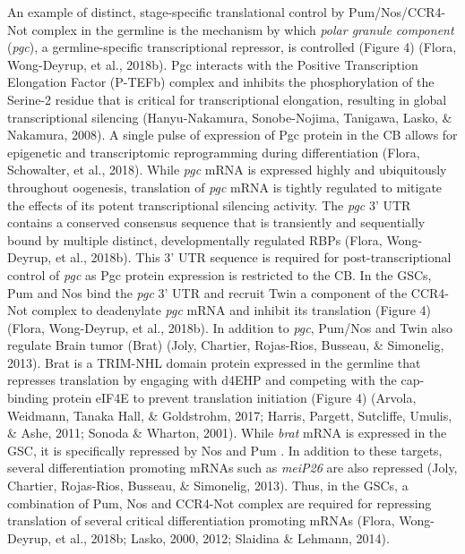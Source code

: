 \documentclass[12pt,oneside]{reedthesis}
\begin{document}
An example of distinct, stage-specific translational control by
Pum/Nos/CCR4-Not complex in the germline is the mechanism by which
\emph{polar granule component} (\emph{pgc}), a germline-specific transcriptional
repressor, is controlled (Figure 4) (Flora, Wong-Deyrup, et al., 2018b). Pgc interacts with
the Positive Transcription Elongation Factor (P-TEFb) complex and
inhibits the phosphorylation of the Serine-2 residue that is critical
for transcriptional elongation, resulting in global transcriptional
silencing (Hanyu-Nakamura, Sonobe-Nojima, Tanigawa, Lasko, \& Nakamura, 2008). A single pulse of expression of Pgc
protein in the CB allows for epigenetic and transcriptomic reprogramming
during differentiation (Flora, Schowalter, et al., 2018). While \emph{pgc} mRNA is expressed
highly and ubiquitously throughout oogenesis, translation of \emph{pgc} mRNA
is tightly regulated to mitigate the effects of its potent
transcriptional silencing activity. The \emph{pgc} 3' UTR contains a
conserved consensus sequence that is transiently and sequentially bound
by multiple distinct, developmentally regulated RBPs (Flora, Wong-Deyrup, et al., 2018b).
This 3' UTR sequence is required for post-transcriptional control of
\emph{pgc} as Pgc protein expression is restricted to the CB. In the GSCs,
Pum and Nos bind the \emph{pgc} 3' UTR and recruit Twin a component of the
CCR4-Not complex to deadenylate \emph{pgc} mRNA and inhibit its translation
(Figure 4) (Flora, Wong-Deyrup, et al., 2018b). In addition to \emph{pgc}, Pum/Nos and Twin also
regulate Brain tumor (Brat) (Joly, Chartier, Rojas-Rios, Busseau, \& Simonelig, 2013). Brat is a TRIM-NHL domain
protein expressed in the germline that represses translation by engaging
with d4EHP and competing with the cap-binding protein eIF4E to prevent
translation initiation (Figure 4) (Arvola, Weidmann, Tanaka Hall, \& Goldstrohm, 2017; Harris, Pargett, Sutcliffe, Umulis, \& Ashe, 2011; Sonoda \& Wharton, 2001). While \emph{brat} mRNA is expressed in the GSC, it is
specifically repressed by Nos and Pum . In addition to these targets,
several differentiation promoting mRNAs such as \emph{meiP26} are also
repressed (Joly, Chartier, Rojas-Rios, Busseau, \& Simonelig, 2013). Thus, in the GSCs, a combination of Pum, Nos
and CCR4-Not complex are required for repressing translation of several
critical differentiation promoting mRNAs (Flora, Wong-Deyrup, et al., 2018b; Lasko, 2000, 2012; Slaidina \& Lehmann, 2014).
\end{document}
